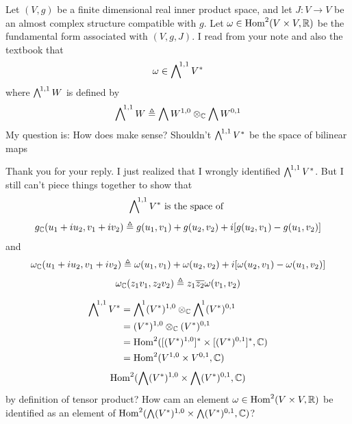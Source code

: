 \documentclass{report}
\begin{document}
\begin{mdframed}
Let $(V,g)$ be a finite dimensional real inner product space, and let $J:V\rightarrow V$ be an almost complex structure compatible with $g$.  Let $\omega\in \operatorname{Hom}^2(V\times V,\mathbb{R})$ be the fundamental form associated with $(V,g,J)$. I read from your note and also the textbook that 
\begin{align}
\label{ggg}
\omega \in \extp^{1,1}V^*
\end{align}
where $\extp^{1,1}W$ is defined by 
\begin{align*}
\extp^{1,1}W \triangleq \extp W^{1,0}\otimes _\C \extp W^{0,1}
\end{align*}
My question is: How does   make sense? Shouldn't $\extp^{1,1}V^*$ be the space of bilinear maps


Thank you for your reply. I just realized that I wrongly identified $\extp^{1,1}V^*$. But I still can't piece things together to show that 
\begin{align}
\extp^{1,1}V^*\text{ is the space of }
\end{align}
 \begin{align*}
g_{\mathbb{C}} (u_1+iu_2, v_1+iv_2)\triangleq g(u_1,v_1)+g(u_2,v_2)+i [g(u_2,v_1)-g(u_1,v_2)]
\end{align*}
and 
\begin{align*}
\omega_{\mathbb{C}} (u_1+iu_2, v_1+iv_2)\triangleq \omega(u_1,v_1)+\omega(u_2,v_2)+i [\omega(u_2,v_1)-\omega(u_1,v_2)]
\end{align*}
\begin{align*}
\omega_{\mathbb{C}} (z_1v_1,z_2v_2)\triangleq z_1 \overline{z_2}\omega (v_1,v_2)
\end{align*}

\begin{align*}
\extp^{1,1}V^* &= \extp^1 (V^{*})^{1,0} \otimes _\C \extp^1 (V^*)^{0,1} \\
&=(V^*)^{1,0}\otimes_\C (V^*)^{0,1} \\
&=\operatorname{Hom}^2([(V^*)^{1,0}]^*\times [(V^*)^{0,1}]^{*}, \C) \\
&=\operatorname{Hom}^2(V^{1,0}\times V^{0,1},\C) 
\end{align*}
\begin{align*}
\operatorname{Hom}^2(\extp (V^*)^{1,0}\times \extp (V^*)^{0,1},\C)
\end{align*}
by definition of tensor product? How cam an element $\omega \in \operatorname{Hom}^2 (V\times V,\mathbb{R})$ be identified as an element of $\operatorname{Hom}^2(\extp (V^*)^{1,0}\times \extp (V^*)^{0,1},\C)$? 
\end{mdframed}
\end{document}
